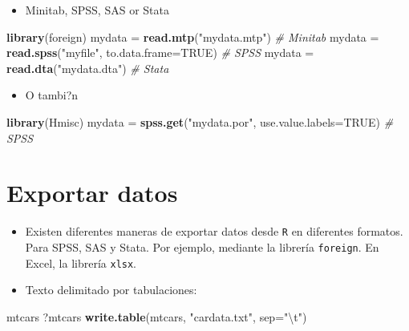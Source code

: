 \documentclass[]{book}
\newenvironment{Shaded}{\begin{snugshade}}{\end{snugshade}}
\newcommand{\KeywordTok}[1]{\textcolor[rgb]{0.13,0.29,0.53}{\textbf{#1}}}
\newcommand{\DataTypeTok}[1]{\textcolor[rgb]{0.13,0.29,0.53}{#1}}
\newcommand{\CharTok}[1]{\textcolor[rgb]{0.31,0.60,0.02}{#1}}
\newcommand{\StringTok}[1]{\textcolor[rgb]{0.31,0.60,0.02}{#1}}
\newcommand{\CommentTok}[1]{\textcolor[rgb]{0.56,0.35,0.01}{\textit{#1}}}
\newcommand{\OtherTok}[1]{\textcolor[rgb]{0.56,0.35,0.01}{#1}}
\newcommand{\NormalTok}[1]{#1}
\providecommand{\tightlist}{%
  \setlength{\itemsep}{0pt}\setlength{\parskip}{0pt}}
\begin{document}
\begin{itemize}
\tightlist
\item
  Minitab, SPSS, SAS or Stata
\end{itemize}

\begin{Shaded}
\begin{Highlighting}[]
\KeywordTok{library}\NormalTok{(foreign)                   }
\NormalTok{mydata =}\StringTok{ }\KeywordTok{read.mtp}\NormalTok{(}\StringTok{"mydata.mtp"}\NormalTok{)  }\CommentTok{# Minitab}
\NormalTok{mydata =}\StringTok{ }\KeywordTok{read.spss}\NormalTok{(}\StringTok{"myfile"}\NormalTok{, }\DataTypeTok{to.data.frame=}\OtherTok{TRUE}\NormalTok{) }\CommentTok{# SPSS}
\NormalTok{mydata =}\StringTok{ }\KeywordTok{read.dta}\NormalTok{(}\StringTok{"mydata.dta"}\NormalTok{) }\CommentTok{# Stata}
\end{Highlighting}
\end{Shaded}

\begin{itemize}
\tightlist
\item
  O tambi?n
\end{itemize}

\begin{Shaded}
\begin{Highlighting}[]
\KeywordTok{library}\NormalTok{(Hmisc)}
\NormalTok{mydata =}\StringTok{ }\KeywordTok{spss.get}\NormalTok{(}\StringTok{"mydata.por"}\NormalTok{, }\DataTypeTok{use.value.labels=}\OtherTok{TRUE}\NormalTok{)  }\CommentTok{# SPSS}
\end{Highlighting}
\end{Shaded}

\section{Exportar datos}\label{exportar-datos}

\begin{itemize}
\item
  Existen diferentes maneras de exportar datos desde \texttt{R} en
  diferentes formatos. Para SPSS, SAS y Stata. Por ejemplo, mediante la
  librería \texttt{foreign}. En Excel, la librería \texttt{xlsx}.
\item
  Texto delimitado por tabulaciones:
\end{itemize}

\begin{Shaded}
\begin{Highlighting}[]
\NormalTok{mtcars}
\NormalTok{?mtcars    }
\KeywordTok{write.table}\NormalTok{(mtcars, }\StringTok{"cardata.txt"}\NormalTok{, }\DataTypeTok{sep=}\StringTok{"}\CharTok{\textbackslash{}t}\StringTok{"}\NormalTok{) }
\end{Highlighting}
\end{Shaded}
\end{document}
